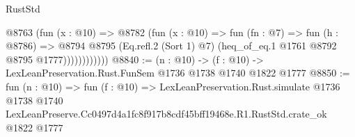 \begin{lexlean}{RustStd}
\begin{coremodule}
                    @8763
                      (fun (x : @10) =>
                      @8782
                        (fun (x : @10) =>
                        fun (fn : @7) =>
                        fun (h : @8786) =>
                        @8794
                          @8795
                          (Eq.refl.{2} (Sort 1) @7)
                          (heq_of_eq.{1} @1761 @8792 @8795 @1777))))))))))))
@8840 := (n : @10) -> (f : @10) -> LexLeanPreservation.Rust.FunSem @1736 @1738 @1740 @1822 @1777
@8850 := fun (n : @10) =>
  fun (f : @10) =>
  LexLeanPreservation.Rust.simulate
    @1736
    @1738
    @1740
    LexLeanPreserve.Cc0497d4a1fc8f917b8cdf45bff19468e.R1.RustStd.crate_ok
    @1822
    @1777
\end{coremodule}
\end{lexlean}
